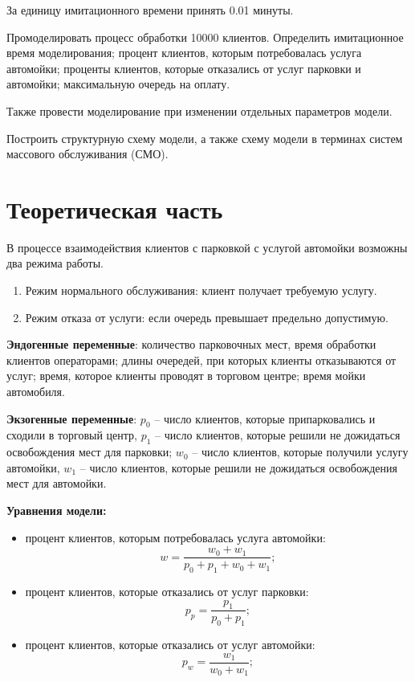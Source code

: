 \documentclass[14pt, a4paper]{extarticle}
\begin{document}
За единицу имитационного времени принять 0.01 минуты.

Промоделировать процесс обработки 10000 клиентов. Определить имитационное время моделирования; процент клиентов, которым потребовалась услуга автомойки; проценты клиентов, которые отказались от услуг парковки и автомойки; максимальную очередь на оплату.

Также провести моделирование при изменении отдельных параметров модели.

Построить структурную схему модели, а также схему модели в терминах систем массового обслуживания (СМО).




\section{Теоретическая часть}


В процессе взаимодействия клиентов с парковкой с услугой автомойки возможны два режима работы.
\begin{enumerate}
	\item Режим нормального обслуживания: клиент получает требуемую услугу.
	\item Режим отказа от услуги: если очередь превышает предельно допустимую.
\end{enumerate}


\textbf{Эндогенные переменные}: количество парковочных мест, время обработки клиентов операторами; длины очередей, при которых клиенты отказываются от услуг; время, которое клиенты проводят в торговом центре; время мойки автомобиля.

\textbf{Экзогенные переменные}: $p_0$ -- число клиентов, которые припарковались и сходили в торговый центр, $p_1$ -- число  клиентов, которые решили не дожидаться освобождения мест для парковки; $w_0$ -- число клиентов, которые получили услугу автомойки, $w_1$ -- число  клиентов, которые решили не дожидаться освобождения мест для автомойки.

\textbf{Уравнения модели:} 
\begin{itemize}
	\item процент клиентов, которым потребовалась услуга автомойки:
	\begin{equation}
		w = \frac{w_0 + w_1}{p_0 + p_1 + w_0 + w_1};
	\end{equation}

	\item процент клиентов, которые отказались от услуг парковки:
\begin{equation}
	p_{\textit{p}} = \frac{p_1}{p_0 + p_1};
\end{equation}

	\item процент клиентов, которые отказались от услуг автомойки:
\begin{equation}
	p_{\textit{w}} = \frac{w_1}{w_0 + w_1};
\end{equation}
\end{itemize}
\end{document}
